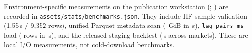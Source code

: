 Environment-specific measurements on the publication workstation
(\OpenMarketHardware{}; \OpenMarketRustVersion{}) are recorded in
\texttt{assets/stats/benchmarks.json}. They include HF sample validation
(1.55\,s / 9{,}352 rows), unified Parquet metadata scan
(\OpenMarketUnifiedGiB{}~GiB in \OpenMarketUnifiedMetaScanSeconds{}\,s),
\texttt{lag\_pairs\_ms} load (\OpenMarketLagPairs{} rows in
\OpenMarketLagPairsLoadSeconds{}\,s), and the released staging backtest
(\OpenMarketBenchBacktest{}\,s across \OpenMarketBenchBacktestMarkets{}
markets). These are local I/O measurements, not cold-download benchmarks.

